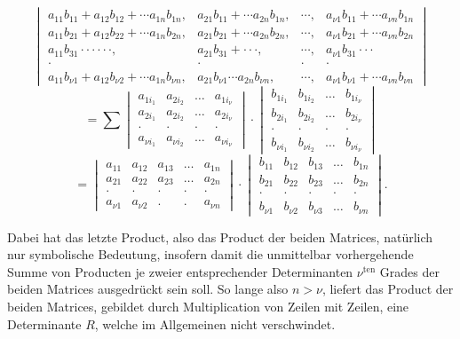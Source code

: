 \documentclass[11pt]{article}
\begin{document}
\[
\begin{vmatrix}
a_{11}b_{11}+a_{12}b_{12}+\cdots a_{1n}b_{1n}, & a_{21}b_{11}+\cdots a_{2n}b_{1n}, & \cdots, & a_{\nu 1}b_{11}+\cdots a_{\nu n}b_{1n}\\
a_{11}b_{21}+a_{12}b_{22}+\cdots a_{1n}b_{2n}, & a_{21}b_{21}+\cdots a_{2n}b_{2n}, & \cdots, & a_{\nu 1}b_{21}+\cdots a_{\nu n}b_{2n}\\
a_{11}b_{31}\cdot\cdot\cdot\cdot\cdot\cdot, & a_{21}b_{31}+\cdot\cdot\cdot, & \cdots, & a_{\nu 1}b_{31}\cdot\cdot\cdot\\
\cdot & \cdot & \cdot & \cdot\\
a_{11}b_{\nu 1}+a_{12}b_{\nu 2}+\cdots a_{1n}b_{\nu n}, & a_{21}b_{\nu 1}\cdots a_{2n}b_{\nu n}, & \cdots, & a_{\nu 1}b_{\nu 1}+\cdots a_{\nu n}b_{\nu n}
\end{vmatrix}
\]
\[
=\sum
\begin{vmatrix}
a_{1i_1} & a_{2i_2} & \dots & a_{1i_\nu}\\
a_{2i_1} & a_{2i_2} & \dots & a_{2i_\nu}\\
\cdot & \cdot & \cdot & \cdot\\
a_{\nu i_1} & a_{\nu i_2} & \dots & a_{\nu i_\nu}
\end{vmatrix}
\cdot
\begin{vmatrix}
b_{1i_1} & b_{1i_2} & \dots & b_{1i_\nu}\\
b_{2i_1} & b_{2i_2} & \dots & b_{2i_\nu}\\
\cdot & \cdot & \cdot & \cdot\\
b_{\nu i_1} & b_{\nu i_2} & \dots & b_{\nu i_\nu}
\end{vmatrix}
\]
\[
=
\begin{vmatrix}
a_{11} & a_{12} & a_{13} & \dots & a_{1n}\\
a_{21} & a_{22} & a_{23} & \dots & a_{2n}\\
\cdot & \cdot & \cdot & \cdot & \cdot\\
a_{\nu 1} & a_{\nu 2} & . & . & a_{\nu n}
\end{vmatrix}
\cdot
\begin{vmatrix}
b_{11} & b_{12} & b_{13} & \dots & b_{1n}\\
b_{21} & b_{22} & b_{23} & \dots & b_{2n}\\
\cdot & \cdot & \cdot & \cdot & \cdot\\
b_{\nu 1} & b_{\nu 2} & b_{\nu 3} & \dots & b_{\nu n}
\end{vmatrix}.
\]

Dabei hat das letzte Product, also das Product der beiden Matrices, natürlich nur symbolische Bedeutung, insofern damit die unmittelbar vorhergehende Summe von Producten je zweier entsprechender Determinanten $\nu^{\text{ten}}$ Grades der beiden Matrices ausgedrückt sein soll. So lange also $n>\nu$, liefert das Product der beiden Matrices, gebildet durch Multiplication von Zeilen mit Zeilen, eine Determinante $R$, welche im Allgemeinen nicht verschwindet.
\end{document}
